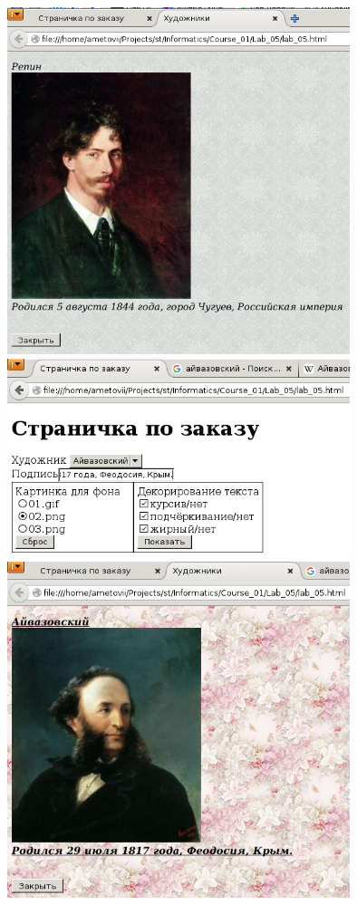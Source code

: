 \begin{center}
  \includegraphics[width=10cm]{img/02.png}
  \includegraphics[width=10cm]{img/03.png}
  \includegraphics[width=10cm]{img/04.png}
\end{center}


